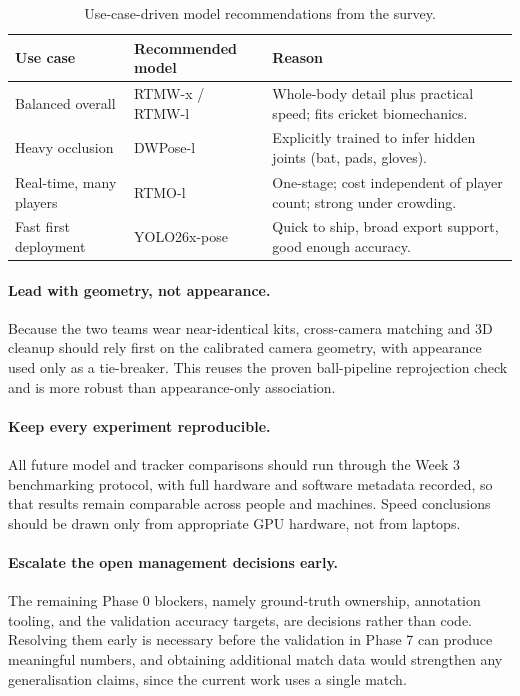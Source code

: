 \documentclass[oneside,openany]{book}
\begin{document}
\begin{table}[!h]
	\begin{center}
		\caption{Use-case-driven model recommendations from the survey.}
		\label{tab:reco}
		\footnotesize
		\begin{tabular}{p{4.4cm}p{3.0cm}p{6.6cm}}
			\toprule
			\textbf{Use case} & \textbf{Recommended model} & \textbf{Reason} \\
			\midrule
			Balanced overall & RTMW-x / RTMW-l & Whole-body detail plus practical speed; fits
			cricket biomechanics. \\
			Heavy occlusion & DWPose-l & Explicitly trained to infer hidden joints (bat, pads,
			gloves). \\
			Real-time, many players & RTMO-l & One-stage; cost independent of player count; strong
			under crowding. \\
			Fast first deployment & YOLO26x-pose & Quick to ship, broad export support, good
			enough accuracy. \\
			\bottomrule
		\end{tabular}
	\end{center}
\end{table}

\paragraph{Lead with geometry, not appearance.} Because the two teams wear near-identical kits,
cross-camera matching and 3D cleanup should rely first on the calibrated camera geometry, with
appearance used only as a tie-breaker. This reuses the proven ball-pipeline reprojection check
and is more robust than appearance-only association.

\paragraph{Keep every experiment reproducible.} All future model and tracker comparisons should
run through the Week 3 benchmarking protocol, with full hardware and software metadata recorded,
so that results remain comparable across people and machines. Speed conclusions should be drawn
only from appropriate GPU hardware, not from laptops.

\paragraph{Escalate the open management decisions early.} The remaining Phase 0 blockers, namely
ground-truth ownership, annotation tooling, and the validation accuracy targets, are decisions
rather than code. Resolving them early is necessary before the validation in Phase 7 can produce
meaningful numbers, and obtaining additional match data would strengthen any generalisation
claims, since the current work uses a single match.
\end{document}
